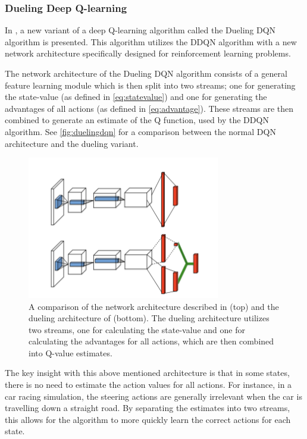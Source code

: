 \documentclass{kththesis}
\begin{document}
\subsubsection{Dueling Deep Q-learning}
In \textcite{wang2015dueling}, a new variant of a deep Q-learning algorithm called the Dueling DQN algorithm is presented. This algorithm utilizes the DDQN algorithm with a new network architecture specifically designed for reinforcement learning problems. 

The network architecture of the Dueling DQN algorithm consists of a general feature learning module which is then split into two streams; one for generating the state-value (as defined in \autoref{eq:statevalue}) and one for generating the advantages of all actions (as defined in \autoref{eq:advantage}). These streams are then combined to generate an estimate of the Q function, used by the DDQN algorithm. See \autoref{fig:duelingdqn} for a comparison between the normal DQN architecture and the dueling variant.

\begin{figure}
\centering
\includegraphics[width=0.75\textwidth]{duddqn.png}
\caption{A comparison of the network architecture described in \textcite{mnih2015human} (top) and the dueling architecture of \textcite{wang2015dueling} (bottom). The dueling architecture utilizes two streams, one for calculating the state-value and one for calculating the advantages for all actions, which are then combined into Q-value estimates. \parencite{wang2015dueling}}
\label{fig:duelingdqn}
\end{figure}

The key insight with this above mentioned architecture is that in some states, there is no need to estimate the action values for all actions. For instance, in a car racing simulation, the steering actions are generally irrelevant when the car is travelling down a straight road. By separating the estimates into two streams, this allows for the algorithm to more quickly learn the correct actions for each state. \parencite{wang2015dueling}
\end{document}
